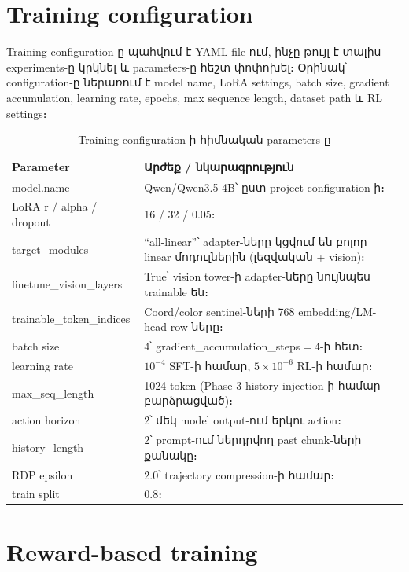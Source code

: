 \documentclass[12pt,a4paper]{report}
\newcommand{\Eng}[1]{\textenglish{#1}}
\begin{document}
\section{Training configuration}

Training configuration-ը պահվում է YAML file-ում, ինչը թույլ է տալիս experiments-ը կրկնել և parameters-ը հեշտ փոփոխել։ Օրինակ՝ configuration-ը ներառում է model name, LoRA settings, batch size, gradient accumulation, learning rate, epochs, max sequence length, dataset path և RL settings։

\begin{table}[H]
\caption{Training configuration-ի հիմնական parameters-ը}
\centering
\begin{tabularx}{\textwidth}{p{5cm}X}
\toprule
\textbf{Parameter} & \textbf{Արժեք / նկարագրություն} \\
\midrule
\Eng{model.name} & \Eng{Qwen/Qwen3.5-4B}՝ ըստ project configuration-ի։ \\
\Eng{LoRA r / alpha / dropout} & 16 / 32 / 0.05։ \\
\Eng{target\_modules} & \Eng{``all-linear''}՝ adapter-ները կցվում են բոլոր linear մոդուլներին (լեզվական + vision)։ \\
\Eng{finetune\_vision\_layers} & True՝ vision tower-ի adapter-ները նույնպես trainable են։ \\
\Eng{trainable\_token\_indices} & Coord/color sentinel-ների 768 embedding/LM-head row-ները։ \\
\Eng{batch size} & 4՝ \Eng{gradient\_accumulation\_steps}$=4$-ի հետ։ \\
\Eng{learning rate} & $10^{-4}$ SFT-ի համար, $5\times10^{-6}$ RL-ի համար։ \\
\Eng{max\_seq\_length} & 1024 token (Phase 3 history injection-ի համար բարձրացված)։ \\
\Eng{action horizon} & 2՝ մեկ model output-ում երկու action։ \\
\Eng{history\_length} & 2՝ prompt-ում ներդրվող past chunk-ների քանակը։ \\
\Eng{RDP epsilon} & 2.0՝ trajectory compression-ի համար։ \\
\Eng{train split} & 0.8։ \\
\bottomrule
\end{tabularx}
\end{table}

\section{Reward-based training}
\end{document}
